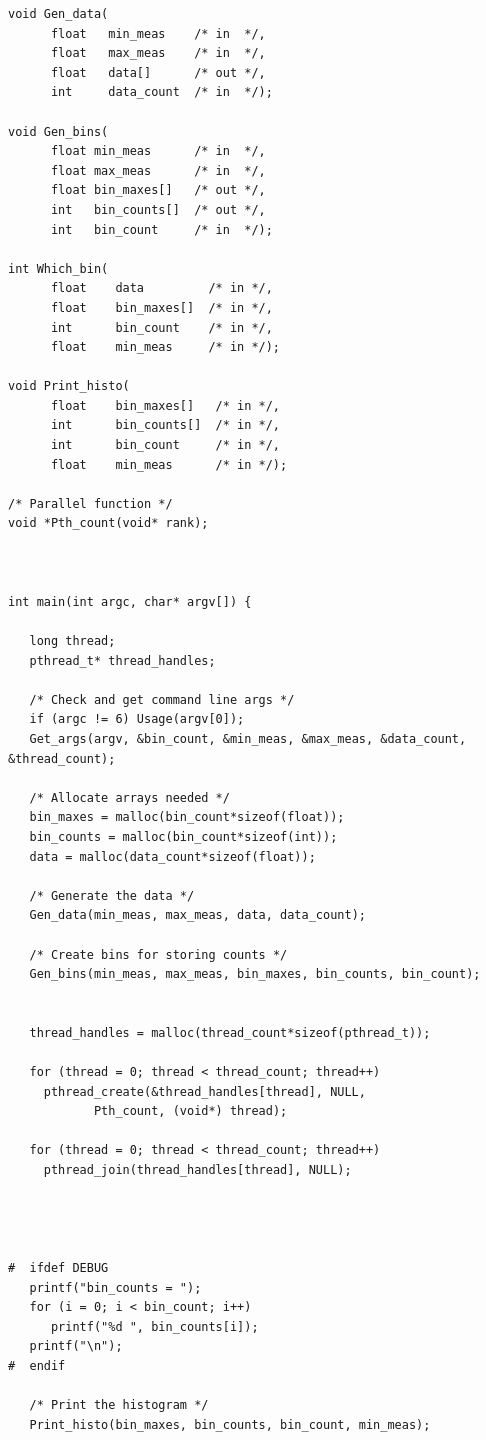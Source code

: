 \documentclass[a4paper,11pt,twoside]{article}
\begin{document}
{{\begin{verbatim}
void Gen_data(
      float   min_meas    /* in  */, 
      float   max_meas    /* in  */, 
      float   data[]      /* out */,
      int     data_count  /* in  */);

void Gen_bins(
      float min_meas      /* in  */, 
      float max_meas      /* in  */, 
      float bin_maxes[]   /* out */, 
      int   bin_counts[]  /* out */, 
      int   bin_count     /* in  */);

int Which_bin(
      float    data         /* in */, 
      float    bin_maxes[]  /* in */, 
      int      bin_count    /* in */, 
      float    min_meas     /* in */);

void Print_histo(
      float    bin_maxes[]   /* in */, 
      int      bin_counts[]  /* in */, 
      int      bin_count     /* in */, 
      float    min_meas      /* in */);

/* Parallel function */
void *Pth_count(void* rank);



int main(int argc, char* argv[]) {
   
   long thread;
   pthread_t* thread_handles;

   /* Check and get command line args */
   if (argc != 6) Usage(argv[0]); 
   Get_args(argv, &bin_count, &min_meas, &max_meas, &data_count, &thread_count);

   /* Allocate arrays needed */
   bin_maxes = malloc(bin_count*sizeof(float));
   bin_counts = malloc(bin_count*sizeof(int));
   data = malloc(data_count*sizeof(float));

   /* Generate the data */
   Gen_data(min_meas, max_meas, data, data_count);

   /* Create bins for storing counts */
   Gen_bins(min_meas, max_meas, bin_maxes, bin_counts, bin_count);


   thread_handles = malloc(thread_count*sizeof(pthread_t));

   for (thread = 0; thread < thread_count; thread++)
     pthread_create(&thread_handles[thread], NULL,
		    Pth_count, (void*) thread);

   for (thread = 0; thread < thread_count; thread++)
     pthread_join(thread_handles[thread], NULL);


   

#  ifdef DEBUG
   printf("bin_counts = ");
   for (i = 0; i < bin_count; i++)
      printf("%d ", bin_counts[i]);
   printf("\n");
#  endif

   /* Print the histogram */
   Print_histo(bin_maxes, bin_counts, bin_count, min_meas);


\end{verbatim}}}
\end{document}
